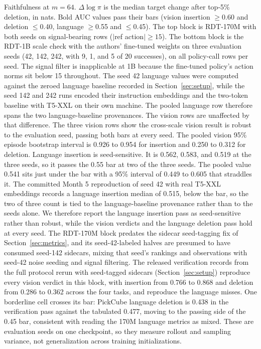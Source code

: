 \documentclass{article}
\begin{document}
\begin{table}[t!]
\caption{Faithfulness at $m{=}64$. $\Delta\log\pi$ is the median target change after top-5\% deletion, in nats. Bold AUC values pass their bars (vision insertion $\geq$0.60 and deletion $\leq$0.40, language $\geq$0.55 and $\leq$0.45). The top block is RDT-170M with both seeds on signal-bearing rows ($|$ref action$| \geq 15$). The bottom block is the RDT-1B scale check with the authors' fine-tuned weights on three evaluation seeds (42, 142, 242, with 9, 1, and 5 of 20 successes), on all policy-call rows per seed. The signal filter is inapplicable at 1B because the fine-tuned policy's action norms sit below 15 throughout. The seed 42 language values were computed against the zeroed language baseline recorded in Section~\ref{sec:setup}, while the seed 142 and 242 runs encoded their instruction embeddings and the two-token baseline with T5-XXL on their own machine. The pooled language row therefore spans the two language-baseline provenances. The vision rows are unaffected by that difference. The three vision rows show the cross-scale vision result is robust to the evaluation seed, passing both bars at every seed. The pooled vision 95\% episode bootstrap interval is 0.926 to 0.954 for insertion and 0.250 to 0.312 for deletion. Language insertion is seed-sensitive. It is 0.562, 0.583, and 0.519 at the three seeds, so it passes the 0.55 bar at two of the three seeds. The pooled value 0.541 sits just under the bar with a 95\% interval of 0.449 to 0.605 that straddles it. The committed Month 5 reproduction of seed 42 with real T5-XXL embeddings records a language insertion median of 0.515, below the bar, so the two of three count is tied to the language-baseline provenance rather than to the seeds alone. We therefore report the language insertion pass as seed-sensitive rather than robust, while the vision verdicts and the language deletion pass hold at every seed. The RDT-170M block predates the sidecar seed-tagging fix of Section~\ref{sec:metrics}, and its seed-42-labeled halves are presumed to have consumed seed-142 sidecars, mixing that seed's rankings and observations with seed-42 noise seeding and signal filtering. The released verification records from the full protocol rerun with seed-tagged sidecars (Section~\ref{sec:setup}) reproduce every vision verdict in this block, with insertion from 0.766 to 0.868 and deletion from 0.286 to 0.362 across the four tasks, and reproduce the language misses. One borderline cell crosses its bar: PickCube language deletion is 0.438 in the verification pass against the tabulated 0.477, moving to the passing side of the 0.45 bar, consistent with reading the 170M language metrics as mixed. These are evaluation seeds on one checkpoint, so they measure rollout and sampling variance, not generalization across training initializations.}
\label{tab:faithfulness}
\end{table}
\end{document}
